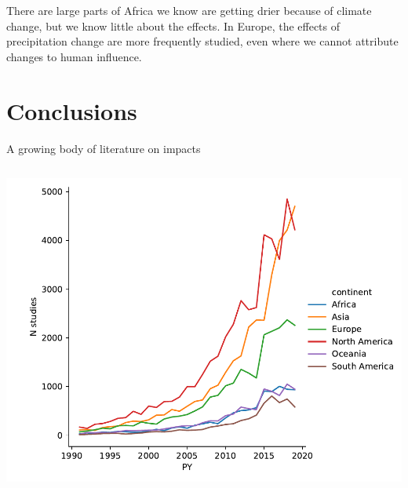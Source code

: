 \documentclass[9pt]{beamer}
\begin{document}
\begin{frame}{There are large parts of Africa we know are getting drier because of climate change, but we know little about the effects.}
In Europe, the effects of precipitation change are more frequently studied, even where we cannot attribute changes to human influence.

\end{frame}


\section{Conclusions}

\begin{frame}
\tableofcontents[currentsection]
\end{frame}

\begin{frame}{A growing body of literature on impacts}

\begin{columns}
	\begin{column}{0.382\linewidth}
		\includegraphics[width=\linewidth]{../plots/literature_distribution/PY_continent_n.pdf}
		

\end{column}
\end{columns}
\end{frame}
\end{document}
